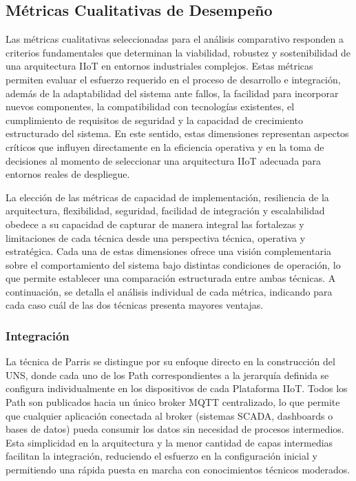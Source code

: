 \subsection{Métricas Cualitativas de Desempeño}

Las métricas cualitativas seleccionadas para el análisis comparativo responden a criterios fundamentales que determinan la viabilidad, robustez y sostenibilidad de una arquitectura IIoT en entornos industriales complejos. Estas métricas permiten evaluar el esfuerzo requerido en el proceso de desarrollo e integración, además de la adaptabilidad del sistema ante fallos, la facilidad para incorporar nuevos componentes, la compatibilidad con tecnologías existentes, el cumplimiento de requisitos de seguridad y la capacidad de crecimiento estructurado del sistema. En este sentido, estas dimensiones representan aspectos críticos que influyen directamente en la eficiencia operativa y en la toma de decisiones al momento de seleccionar una arquitectura IIoT adecuada para entornos reales de despliegue.

La elección de las métricas de capacidad de implementación, resiliencia de la arquitectura, flexibilidad, seguridad, facilidad de integración y escalabilidad obedece a su capacidad de capturar de manera integral las fortalezas y limitaciones de cada técnica desde una perspectiva técnica, operativa y estratégica. Cada una de estas dimensiones ofrece una visión complementaria sobre el comportamiento del sistema bajo distintas condiciones de operación, lo que permite establecer una comparación estructurada entre ambas técnicas. A continuación, se detalla el análisis individual de cada métrica, indicando para cada caso cuál de las dos técnicas presenta mayores ventajas.

\subsubsection{Integración}
La técnica de Parris se distingue por su enfoque directo en la construcción del UNS, donde cada uno de los Path correspondientes a la jerarquía definida se configura individualmente en los dispositivos de cada Plataforma IIoT. Todos los Path son publicados hacia un único broker MQTT centralizado, lo que permite que cualquier aplicación conectada al broker (sistemas SCADA, dashboards o bases de datos) pueda consumir los datos sin necesidad de procesos intermedios. Esta simplicidad en la arquitectura y la menor cantidad de capas intermedias facilitan la integración, reduciendo el esfuerzo en la configuración inicial y permitiendo una rápida puesta en marcha con conocimientos técnicos moderados.

